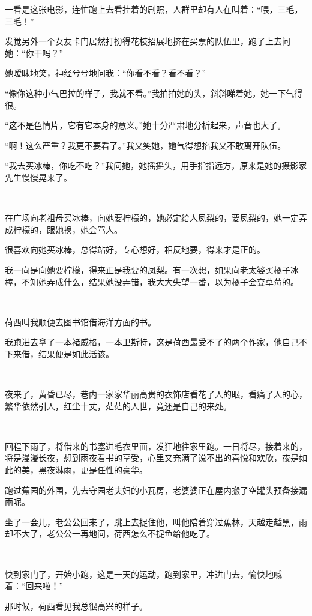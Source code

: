 \par 一看是这张电影，连忙跑上去看挂着的剧照，人群里却有人在叫着：“喂，三毛，三毛！”
\par 发觉另外一个女友卡门居然打扮得花枝招展地挤在买票的队伍里，跑了上去问她：“你干吗？”
\par 她暧昧地笑，神经兮兮地问我：“你看不看？看不看？”
\par “像你这种小气巴拉的样子，我就不看。”我拍拍她的头，斜斜睇着她，她一下气得很。
\par “这不是色情片，它有它本身的意义。”她十分严肃地分析起来，声音也大了。
\par “啊！这么严重？我更不要看了。”我又笑她，她气得想掐我又不敢离开队伍。
\par “我去买冰棒，你吃不吃？”我问她，她摇摇头，用手指指远方，原来是她的摄影家先生慢慢晃来了。
\par  
\par 在广场向老祖母买冰棒，向她要柠檬的，她必定给人凤梨的，要凤梨的，她一定弄成柠檬的，跟她换，她会骂人。
\par 很喜欢向她买冰棒，总得站好，专心想好，相反地要，得来才是正的。
\par 我一向是向她要柠檬，得来正是我要的凤梨。有一次想，如果向老太婆买橘子冰棒，不知她弄成什么，结果她没弄错，我大大失望一番，以为橘子会变草莓的。
\par  
\par 荷西叫我顺便去图书馆借海洋方面的书。
\par 我跑进去拿了一本褚威格，一本卫斯特，这是荷西最受不了的两个作家，他自己不下来借，结果便是如此活该。
\par  
\par 夜来了，黄昏已尽，巷内一家家华丽高贵的衣饰店看花了人的眼，看痛了人的心，繁华依然引人，红尘十丈，茫茫的人世，竟还是自己的来处。
\par  
\par 回程下雨了，将借来的书塞进毛衣里面，发狂地往家里跑。一日将尽，接着来的，将是漫漫长夜，想到雨夜看书的享受，心里又充满了说不出的喜悦和欢欣，夜是如此的美，黑夜淋雨，更是任性的豪华。
\par 跑过蕉园的外围，先去守园老夫妇的小瓦房，老婆婆正在屋内搬了空罐头预备接漏雨呢。
\par 坐了一会儿，老公公回来了，跳上去捉住他，叫他陪着穿过蕉林，天越走越黑，雨却不大了，老公公一再地问，荷西怎么不捉鱼给他吃了。
\par  
\par 快到家门了，开始小跑，这是一天的运动，跑到家里，冲进门去，愉快地喊着：“回来啦！”
\par 那时候，荷西看见我总很高兴的样子。

